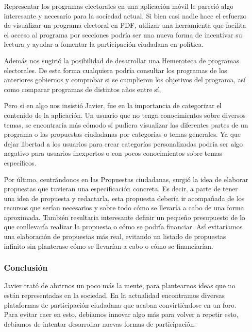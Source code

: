 Representar los programas electorales en una aplicación móvil le pareció algo interesante y necesario para la sociedad actual. Si bien casi nadie hace el esfuerzo de visualizar un programa electoral en PDF, utilizar una herramienta que facilita el acceso al programa por secciones podría ser una nueva forma de incentivar su lectura y ayudar a fomentar la participación ciudadana en política. 

Además nos sugirió la posibilidad de desarrollar una Hemeroteca de programas electorales. De esta forma cualquiera podría consultar los programas de los anteriores gobiernos y comprobar si se cumplieron los objetivos del programa, así como comparar programas de distintos años entre sí, 

Pero si en algo nos insistió Javier, fue en la importancia de categorizar el contenido de la aplicación. Un usuario que no tenga conocimientos sobre diversos temas, se encontraría más cómodo si pudiera visualizar las diferentes partes de un programa o las propuestas ciudadanas por categorías o temas generales. Ya que dejar libertad a los usuarios para crear categorías personalizadas podría ser algo negativo para usuarios inexpertos o con pocos conocimientos sobre temas específicos.

Por último, centrándonos en las Propuestas ciudadanas, surgió la idea de elaborar propuestas que tuvieran una especificación concreta. Es decir, a parte de tener una idea de propuesta y redactarla, esta propuesta debería ir acompañada de los recursos que serían necesarios y sobre todo cómo se llevaría a cabo de una forma aproximada. También resultaría interesante definir un pequeño presupuesto de lo que conllevaría realizar la propuesta o cómo se podría financiar. Así evitaríamos una elaboración de propuestas más real, evitando un listado de propuestas infinito sin planterase cómo se llevarían a cabo o cómo se financiarían.

\subsubsection{Conclusión}

Javier trató de abrirnos un poco más la mente, para plantearnos ideas que no están representadas en la sociedad. En la actualidad encontramos diversas plataformas de participación ciudadana que acaban convirtiéndose en un foro. Para evitar caer en esto, debíamos innovar algo más para volver a repetir esto, debíamos de intentar desarrollar nuevas formas de participación.

